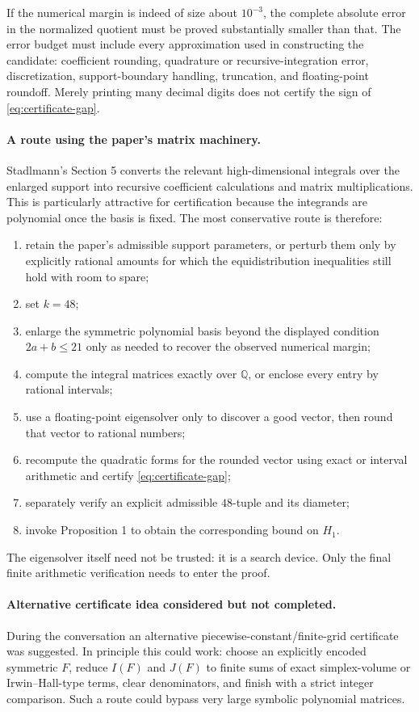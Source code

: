 \documentclass[11pt]{article}
\begin{document}
If the numerical margin is indeed of size about $10^{-3}$, the complete absolute error in the normalized quotient must be proved substantially smaller than that.  The error budget must include every approximation used in constructing the candidate: coefficient rounding, quadrature or recursive-integration error, discretization, support-boundary handling, truncation, and floating-point roundoff.  Merely printing many decimal digits does not certify the sign of \eqref{eq:certificate-gap}.

\paragraph{A route using the paper's matrix machinery.}
Stadlmann's Section 5 converts the relevant high-dimensional integrals over the enlarged support into recursive coefficient calculations and matrix multiplications.  This is particularly attractive for certification because the integrands are polynomial once the basis is fixed.  The most conservative route is therefore:
\begin{enumerate}
\item retain the paper's admissible support parameters, or perturb them only by explicitly rational amounts for which the equidistribution inequalities still hold with room to spare;
\item set $k=48$;
\item enlarge the symmetric polynomial basis beyond the displayed condition $2a+b\le21$ only as needed to recover the observed numerical margin;
\item compute the integral matrices exactly over $\mathbb Q$, or enclose every entry by rational intervals;
\item use a floating-point eigensolver only to discover a good vector, then round that vector to rational numbers;
\item recompute the quadratic forms for the rounded vector using exact or interval arithmetic and certify \eqref{eq:certificate-gap};
\item separately verify an explicit admissible $48$-tuple and its diameter;
\item invoke Proposition 1 to obtain the corresponding bound on $H_1$.
\end{enumerate}
The eigensolver itself need not be trusted: it is a search device.  Only the final finite arithmetic verification needs to enter the proof.

\paragraph{Alternative certificate idea considered but not completed.}
During the conversation an alternative piecewise-constant/finite-grid certificate was suggested.  In principle this could work: choose an explicitly encoded symmetric $F$, reduce $I(F)$ and $J(F)$ to finite sums of exact simplex-volume or Irwin--Hall-type terms, clear denominators, and finish with a strict integer comparison.  Such a route could bypass very large symbolic polynomial matrices.
\end{document}
